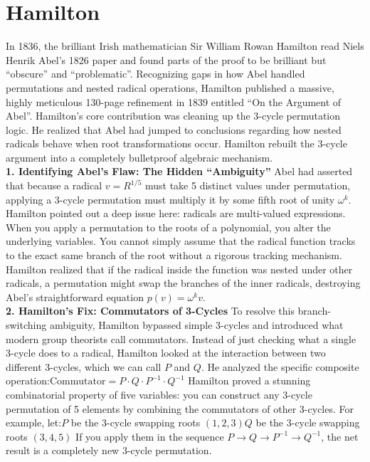 \section{Hamilton}

In 1836, the brilliant Irish mathematician Sir William Rowan Hamilton read Niels Henrik Abel's 1826 paper and found parts of the proof to be brilliant but ``obscure'' and ``problematic''. 
Recognizing gaps in how Abel handled permutations and nested radical operations, Hamilton published a massive, highly meticulous 130-page refinement in 1839 entitled ``On the Argument of Abel''.
Hamilton's core contribution was cleaning up the 3-cycle permutation logic. 
He realized that Abel had jumped to conclusions regarding how nested radicals behave when root transformations occur. 
Hamilton rebuilt the 3-cycle argument into a completely bulletproof algebraic mechanism.\\

{\bf 1. Identifying Abel's Flaw:  The Hidden ``Ambiguity''}
Abel had asserted that because a radical \(v = R^{1/5}\) must take 5 distinct values under permutation, applying a 3-cycle permutation must multiply it by some fifth root of unity \(\omega ^{k}\).
Hamilton pointed out a deep issue here: radicals are multi-valued expressions. 
When you apply a permutation to the roots of a polynomial, you alter the underlying variables.
You cannot simply assume that the radical function tracks to the exact same branch of the root without a rigorous tracking mechanism. 
Hamilton realized that if the radical inside the function was nested under other radicals, a permutation might swap the branches of the inner radicals, destroying Abel's straightforward equation \(p(v) = \omega^k v\).\\ 

{\bf 2. Hamilton's Fix: Commutators of 3-Cycles}
To resolve this branch-switching ambiguity, Hamilton bypassed simple 3-cycles and introduced what modern group theorists call commutators.
Instead of just checking what a single 3-cycle does to a radical, Hamilton looked at the interaction between two different 3-cycles, which we can call \(P\) and \(Q\). 
He analyzed the specific composite operation:\(\text{Commutator}=P\cdot Q\cdot P^{-1}\cdot Q^{-1}\)
Hamilton proved a stunning combinatorial property of five variables: you can construct any 3-cycle permutation of 5 elements by combining the commutators of other 3-cycles.
For example, let:\(P\) be the 3-cycle swapping roots \((1, 2, 3)\)\(Q\) be the 3-cycle swapping roots \((3, 4, 5)\)
If you apply them in the sequence \(P \to Q \to P^{-1} \to Q^{-1}\), the net result is a completely new 3-cycle permutation.\\ 

